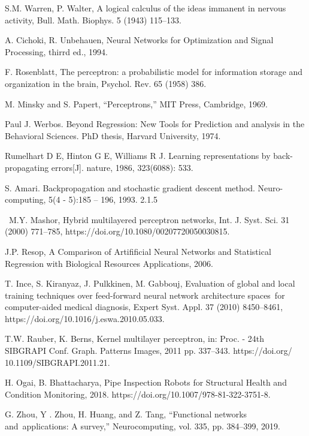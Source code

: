 \documentclass[15pt]{article}
\begin{document}
\begin{thebibliography}{99}  

 S.M. Warren, P. Walter, A logical calculus of the ideas immanent in nervous activity, Bull. Math. Biophys. 5 (1943) 115–133.

 A. Cichoki, R. Unbehauen, Neural Networks for Optimization and Signal Processing, thirrd ed., 1994.

 F. Rosenblatt, The perceptron: a probabilistic model for information storage and organization in the brain, Psychol. Rev. 65 (1958) 386.

 M. Minsky and S. Papert, “Perceptrons,” MIT Press, Cambridge, 1969.

 Paul J. Werbos. Beyond Regression: New Tools for Prediction and analysis in the Behavioral Sciences. PhD thesis, Harvard University, 1974.

 Rumelhart D E, Hinton G E, Williams R J. Learning representations by back-propagating errors[J]. nature, 1986, 323(6088): 533.

 S. Amari. Backpropagation and stochastic gradient descent method. Neuro-computing, 5(4 - 5):185 – 196, 1993. 2.1.5

 M.Y. Mashor, Hybrid multilayered perceptron networks, Int. J. Syst. Sci. 31 (2000) 771–785, https://doi.org/10.1080/00207720050030815.

 J.P. Resop, A Comparison of Artifificial Neural Networks and Statistical Regression with Biological Resources Applications, 2006.

 T. Ince, S. Kiranyaz, J. Pulkkinen, M. Gabbouj, Evaluation of global and local training techniques over feed-forward neural network architecture spaces for computer-aided medical diagnosis, Expert Syst. Appl. 37 (2010) 8450–8461, https://doi.org/10.1016/j.eswa.2010.05.033.

 T.W. Rauber, K. Berns, Kernel multilayer perceptron, in: Proc. - 24th SIBGRAPI Conf. Graph. Patterns Images, 2011 pp. 337–343. https://doi.org/ 10.1109/SIBGRAPI.2011.21.

 H. Ogai, B. Bhattacharya, Pipe Inspection Robots for Structural Health and Condition Monitoring, 2018. https://doi.org/10.1007/978-81-322-3751-8.

 G. Zhou, Y . Zhou, H. Huang, and Z. Tang, “Functional networks and applications: A survey,” Neurocomputing, vol. 335, pp. 384–399, 2019.


\end{thebibliography}
\end{document}

